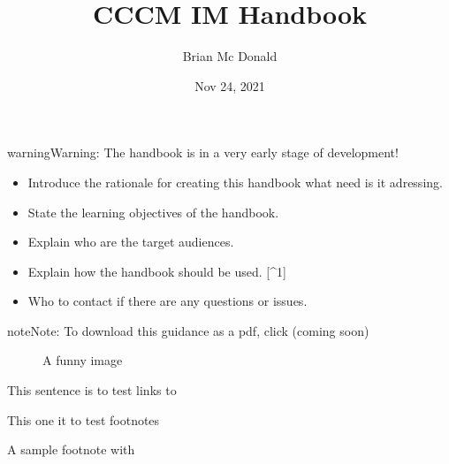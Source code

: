 \documentclass[letterpaper,10pt,english]{jupyterBook}
\title{CCCM IM Handbook}
\date{Nov 24, 2021}
\author{Brian Mc Donald}
\let\sphinxpxdimen\pdfpxdimen\else\newdimen\sphinxpxdimen
\begin{document}
\pagestyle{empty}
\sphinxmaketitle
\pagestyle{plain}
\sphinxtableofcontents
\pagestyle{normal}
\label{\detokenize{introduction::doc}}


\begin{sphinxadmonition}{warning}{Warning:}
\sphinxAtStartPar
The handbook is in a very early stage of development!
\end{sphinxadmonition}
\begin{itemize}
\item {} 
\sphinxAtStartPar
Introduce the rationale for creating this handbook \sphinxhyphen{} what need is it adressing.

\item {} 
\sphinxAtStartPar
State the learning objectives of the handbook.

\item {} 
\sphinxAtStartPar
Explain who are the target audiences.

\item {} 
\sphinxAtStartPar
Explain how the handbook should be used. {[}\textasciicircum{}1{]}

\item {} 
\sphinxAtStartPar
Who to contact if there are any questions or issues.

\end{itemize}

\begin{sphinxShadowBox}
\sphinxstylesidebartitle{}

\begin{sphinxadmonition}{note}{Note:}
\sphinxAtStartPar
To download this guidance as a pdf, click  (coming soon)
\end{sphinxadmonition}
\end{sphinxShadowBox}

\begin{figure}[htbp]
\centering
\capstart

\noindent\sphinxincludegraphics[width=400\sphinxpxdimen]{{spirits}.jpg}
\caption{A funny image}\label{\detokenize{introduction:id2}}\end{figure}

\sphinxAtStartPar
This sentence is to test links to 

\sphinxAtStartPar
This one it to test footnotes %
\begin{footnote}[1]\sphinxAtStartFootnote
A sample footnote with 
%
\end{footnote}
\end{document}
